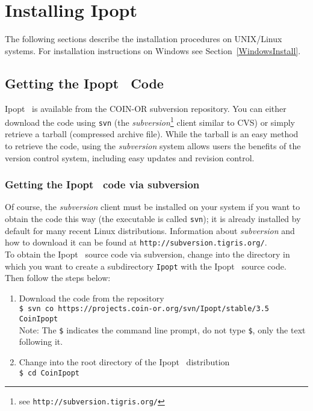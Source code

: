\documentclass[10pt]{article}
\newcommand{\Ipopt}{{\sc Ipopt }}
\begin{document}
\section{Installing \Ipopt}\label{Installing}

The following sections describe the installation procedures on
UNIX/Linux systems.  For installation instructions on Windows
see Section~\ref{WindowsInstall}.

\subsection{Getting the \Ipopt\ Code}
\Ipopt\ is available from the COIN-OR subversion repository. You can
either download the code using \texttt{svn} (the
\textit{subversion}\footnote{see
  \texttt{http://subversion.tigris.org/}} client similar to CVS) or
simply retrieve a tarball (compressed archive file).  While the
tarball is an easy method to retrieve the code, using the
\textit{subversion} system allows users the benefits of the version
control system, including easy updates and revision control.

\subsubsection{Getting the \Ipopt\ code via subversion}

Of course, the \textit{subversion} client must be installed on your
system if you want to obtain the code this way (the executable is
called \texttt{svn}); it is already installed by default for many
recent Linux distributions.  Information about \textit{subversion} and
how to download it can be found at
\texttt{http://subversion.tigris.org/}.\\

To obtain the \Ipopt\ source code via subversion, change into the
directory in which you want to create a subdirectory {\tt Ipopt} with
the \Ipopt\ source code.  Then follow the steps below:
\begin{enumerate}
\item{Download the code from the repository}\\
{\tt \$ svn co https://projects.coin-or.org/svn/Ipopt/stable/3.5 CoinIpopt} \\
Note: The {\tt \$} indicates the command line
prompt, do not type {\tt \$}, only the text following it.
\item Change into the root directory of the \Ipopt\ distribution\\
{\tt \$ cd CoinIpopt}
\end{enumerate}
\end{document}
